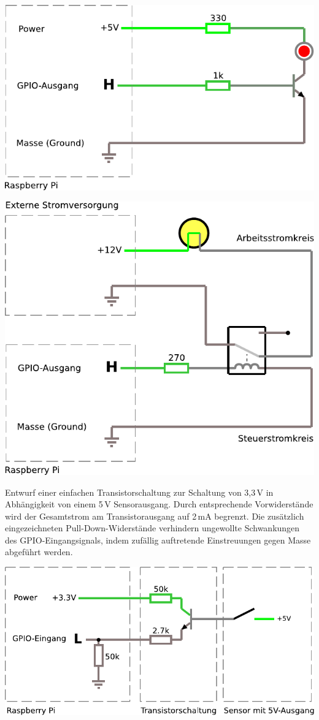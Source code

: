\begin{center}
    \includegraphics[width=.8\linewidth]{2-hardwaredesign/img/led_transistor_circuitjs}
    \bigskip

    \includegraphics[width=.8\linewidth]{2-hardwaredesign/img/led_relais_circuitjs}
\end{center}

\bigskip
\teilaufgabe
Entwurf einer einfachen Transistorschaltung zur Schaltung von 3,3\,V in
Abhängigkeit von einem 5\,V Sensorausgang. Durch entsprechende Vorwiderstände
wird der Gesamtstrom am Transistorausgang auf 2\,mA begrenzt. Die zusätzlich
eingezeichneten Pull-Down-Widerstände verhindern ungewollte Schwankungen des
GPIO-Eingangsignals, indem zufällig auftretende Einstreuungen gegen Masse
abgeführt werden.

\includegraphics[width=\textwidth]{2-hardwaredesign/img/logiklevel_transistor_aufgabe}



